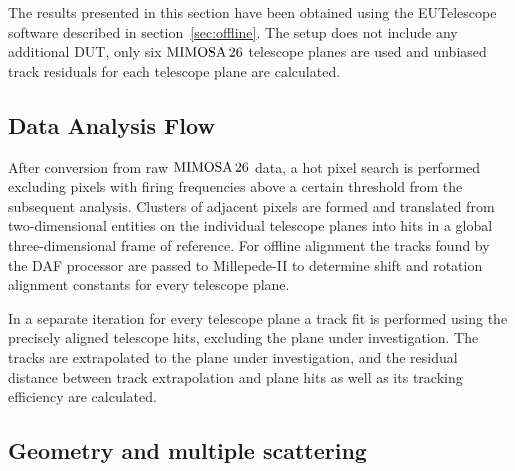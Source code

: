 The results presented in this section have been obtained using the EUTelescope software described in section~\ref{sec:offline}.
The setup does not include any additional DUT, only six $\textrm{MIMOSA\,26}$ telescope planes are used and unbiased track residuals for each telescope plane are calculated.

\subsection{Data Analysis Flow}
\label{sec:datura-nodut}

After conversion from raw $\textrm{MIMOSA\,26}$ data, a hot pixel search is performed excluding pixels with firing frequencies above a certain threshold from the subsequent analysis.
Clusters of adjacent pixels are formed and translated from two-dimensional entities on the individual telescope planes into hits in a global three-dimensional frame of reference.
For offline alignment the tracks found by the DAF processor are passed to Millepede-II to determine shift and rotation alignment constants for every telescope plane.

In a separate iteration for every telescope plane a track fit is performed using the precisely aligned telescope hits, excluding the plane under investigation.
The tracks are extrapolated to the plane under investigation, and the residual distance between track extrapolation and plane hits as well as its tracking efficiency are calculated.

\subsection{Geometry and multiple scattering}
\label{sec:multiplescattering}

